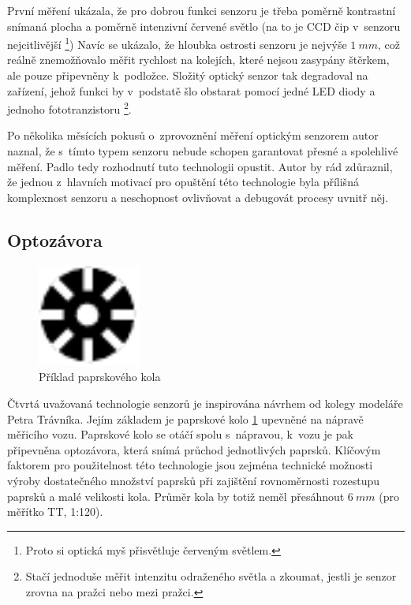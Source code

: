 První měření ukázala, že pro dobrou funkci senzoru je třeba poměrně kontrastní
snímaná plocha a poměrně intenzivní červené světlo (na to je CCD čip v~senzoru
nejcitlivější \footnote{Proto si optická myš přisvětluje červeným světlem.})
Navíc se ukázalo, že hloubka ostrosti senzoru je nejvýše $1\ mm$, což reálně
znemožňovalo měřit rychlost na kolejích, které nejsou zasypány štěrkem, ale
pouze připevněny k~podložce. Složitý optický senzor tak degradoval na zařízení,
jehož funkci by v~podstatě šlo obstarat pomocí jedné LED diody a jednoho
fototranzistoru \footnote{Stačí jednoduše měřit intenzitu odraženého světla a
zkoumat, jestli je senzor zrovna na pražci nebo mezi pražci.}.

Po několika měsících pokusů o~zprovoznění měření optickým senzorem autor naznal,
že s~tímto typem senzoru nebude schopen garantovat přesné a spolehlivé měření.
Padlo tedy rozhodnutí tuto technologii opustit. Autor by rád zdůraznil, že
jednou z~hlavních motivací pro opuštění této technologie byla přílišná
komplexnost senzoru a neschopnost ovlivňovat a debugovát procesy uvnitř něj.

\subsection{Optozávora}
\label{subsec:wsm-senzor-optozavora}

\begin{figure}[h]
\includegraphics[width=0.3\textwidth]{data/clonka.pdf}
\caption{Příklad paprskového kola}
\label{fig:wheel}
\end{figure}

Čtvrtá uvažovaná technologie senzorů je inspirována návrhem od kolegy modeláře
Petra Trávníka. Jejím základem je paprskové kolo \ref{fig:wheel}
upevněné na nápravě měřicího vozu. Paprskové kolo se otáčí spolu s~nápravou,
k~vozu je pak připevněna optozávora, která snímá průchod jednotlivých paprsků.
Klíčovým faktorem pro použitelnost této technologie jsou zejména technické
možnosti výroby dostatečného množství paprsků při zajištění rovnoměrnosti
rozestupu paprsků a malé velikosti kola. Průměr kola by totiž neměl přesáhnout
$6\ mm$ (pro měřítko TT, 1:120).

